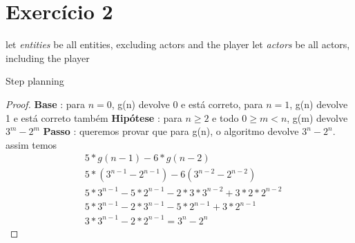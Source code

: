\documentclass{article}
\begin{document}
\section{Exercício 2}
\begin{algorithm}
	let \textit{entities} be all entities, excluding actors and the player\;
	let \textit{actors} be all actors, including the player\;
	\caption{Step planning}\label{alg:step_planning}
\end{algorithm}
\begin{proof}
	\hfill \break
	\textbf{Base} : para $n = 0$, g(n) devolve 0 e está correto,\newline
	\hspace*{30pt} para $n = 1$, g(n) devolve 1 e está correto também\newline
	\newline
	\textbf{Hipótese} : para $n \geq 2$ e todo $0\geq m < n$, g(m) devolve $3^m-2^m$\newline
	\textbf{Passo} : queremos provar que para g(n), o algoritmo devolve $3^n-2^n$.\newline
	\hspace*{30pt} assim temos \newline
	\begin{equation}
		\begin{split}
		& 5*g(n-1) - 6*g(n-2) \\
		&5*(3^{n-1} - 2^{n-1}) - 6(3^{n-2}-2^{n-2})\\
		&5*3^{n-1} - 5*2^{n-1} - 2*3*3^{n-2} + 3*2*2^{n-2}\\
		&5*3^{n-1} - 2*3^{n-1} - 5*2^{n-1} + 3*2^{n-1}\\
		&3*3^{n-1} - 2*2^{n-1} = 3^n - 2^n
		\end{split}	
	\end{equation}	
\end{proof}
\end{document}
